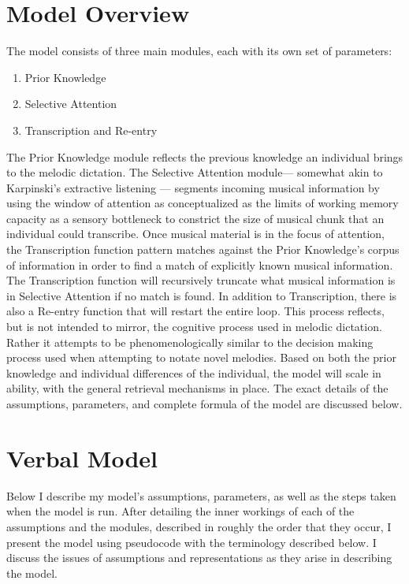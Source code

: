 \documentclass[12pt,]{book}
\providecommand{\tightlist}{%
  \setlength{\itemsep}{0pt}\setlength{\parskip}{0pt}}
\begin{document}
\hypertarget{model-overview}{%
\section{Model Overview}\label{model-overview}}

The model consists of three main modules, each with its own set of parameters:

\begin{enumerate}
\def\labelenumi{\arabic{enumi}.}
\tightlist
\item
  Prior Knowledge
\item
  Selective Attention
\item
  Transcription and Re-entry
\end{enumerate}

The Prior Knowledge module reflects the previous knowledge an individual brings to the melodic dictation.
The Selective Attention module--- somewhat akin to Karpinski's extractive listening \citep{karpinskiAuralSkillsAcquisition2000, karpinskiModelMusicPerception1990}--- segments incoming musical information by using the window of attention as conceptualized as the limits of working memory capacity as a sensory bottleneck to constrict the size of musical chunk that an individual could transcribe.
Once musical material is in the focus of attention, the Transcription function pattern matches against the Prior Knowledge's corpus of information in order to find a match of explicitly known musical information.
The Transcription function will recursively truncate what musical information is in Selective Attention if no match is found.
In addition to Transcription, there is also a Re-entry function that will restart the entire loop.
This process reflects, but is not intended to mirror, the cognitive process used in melodic dictation.
Rather it attempts to be phenomenologically similar to the decision making process used when attempting to notate novel melodies.
Based on both the prior knowledge and individual differences of the individual, the model will scale in ability, with the general retrieval mechanisms in place.
The exact details of the assumptions, parameters, and complete formula of the model are discussed below.

\hypertarget{verbal-model}{%
\section{Verbal Model}\label{verbal-model}}

Below I describe my model's assumptions, parameters, as well as the steps taken when the model is run.
After detailing the inner workings of each of the assumptions and the modules, described in roughly the order that they occur, I present the model using pseudocode with the terminology described below.
I discuss the issues of assumptions and representations as they arise in describing the model.
\end{document}
